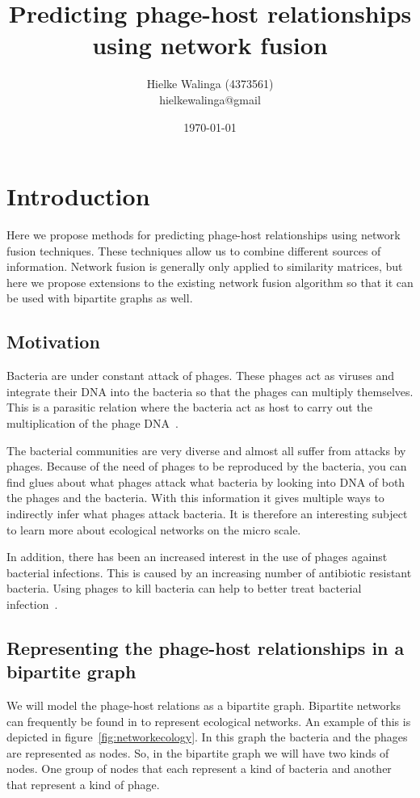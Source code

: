 \documentclass{article}
\title{Predicting phage-host relationships using network fusion}
\author{Hielke Walinga (4373561) \\ hielkewalinga@gmail}
\date{\today}
\begin{document}
\maketitle

\section{Introduction}

Here we propose methods for predicting phage-host relationships 
using network fusion techniques. 
These techniques allow us to combine different sources of information.
Network fusion is generally only applied to similarity matrices,
but here we propose extensions to the existing network fusion algorithm so that it 
can be used with bipartite graphs as well.

\subsection{Motivation}

Bacteria are under constant attack of phages. These phages act as viruses and
integrate their DNA into the bacteria so that the phages can multiply themselves.
This is a parasitic relation where the bacteria act as host to carry out the
multiplication of the phage DNA~\cite{seed2015battling}.

The bacterial communities are very diverse and almost all suffer from
attacks by phages. Because of the need of phages to be reproduced by the bacteria,
you can find glues about what phages attack what bacteria by looking into
DNA of both the phages and the bacteria.
With this information it gives multiple ways to indirectly infer what phages attack bacteria.
It is therefore an interesting subject to learn more about ecological 
networks on the micro scale.

In addition, there has been an increased interest in the use of phages against
bacterial infections. This is caused by an increasing number 
of antibiotic resistant bacteria. Using phages to 
kill bacteria can help to better treat bacterial infection~\cite{nobrega2015revisiting}.

\subsection{Representing the phage-host relationships in a bipartite graph}

We will model the phage-host relations as a bipartite graph. 
Bipartite networks can frequently be found in to represent 
ecological networks. An example of this is depicted in figure~\ref{fig:networkecology}.
In this graph the bacteria and the phages are represented as nodes.
So, in the bipartite graph we will have two kinds of nodes. One group 
of nodes that each represent a kind of bacteria and another that represent
a kind of phage.
\end{document}
